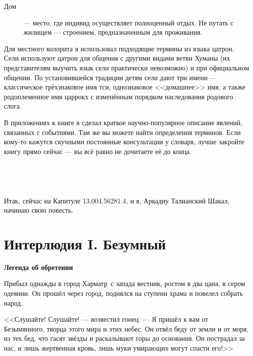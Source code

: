 \begin{description}
\item[Дом] --- место, где индивид осуществляет полноценный отдых.
Не путать с жилищем --- строением, предназначенным для проживания\FM.
\end{description}

Для местного колорита я использовал подходящие термины из языка цатрон.
Сели используют цатрон для общения с другими видами ветви Хуманы (их представителям выучить язык сели практически невозможно) и при официальном общении.
По установившейся традиции детям сели дают три имени --- классическое трёхзнаковое имя тси, однознаковое <<домашнее>> имя, а также родоплеменное имя царрокх с изменённым порядком наследования родового слога.

В приложениях к книге я сделал краткое научно-популярное описание явлений, связанных с событиями.
Там же вы можете найти определения терминов.
Если кому-то кажутся скучными постоянные консультации у словаря, лучше закройте книгу прямо сейчас --- вы всё равно не дочитаете её до конца.

~

~

Итак, сейчас на Капитуле 13.004.56281.4, и я, Аркадиу Талианский Шакал, начинаю свою повесть.

\chapter*{Интерлюдия I. Безумный}


\textbf{Легенда об обретении}

Прибыл однажды в город Харматр\FM\ с запада вестник, ростом в два цана, в сером одеянии.
Он прошёл через город, поднялся на ступени храма и повелел собрать народ.

<<Слушайте! Слушайте! --- возвестил гонец.
--- Я пришёл к вам от Безымянного, творца этого мира и этих небес.
Он отвёл беду от земли и от моря, из тех бед, что гасят звёзды и раскалывают горы до основания.
Он пострадал за нас, и лишь жертвенная кровь, лишь муки умирающих могут спасти его!>>

